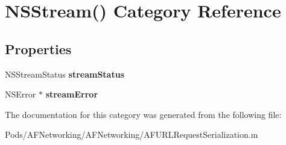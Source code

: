 \hypertarget{category_n_s_stream_07_08}{}\section{N\+S\+Stream() Category Reference}
\label{category_n_s_stream_07_08}
\subsection*{Properties}
\begin{DoxyCompactItemize}
\item 
\mbox{\label{category_n_s_stream_07_08_a380fb254540df401c389d64b0159d9da}} 
N\+S\+Stream\+Status {\bfseries stream\+Status}
\item 
\mbox{\label{category_n_s_stream_07_08_a44d8a05bedbaee9cef1399e6ecf7b67a}} 
N\+S\+Error $\ast$ {\bfseries stream\+Error}
\end{DoxyCompactItemize}


The documentation for this category was generated from the following file\+:\begin{DoxyCompactItemize}
\item 
Pods/\+A\+F\+Networking/\+A\+F\+Networking/A\+F\+U\+R\+L\+Request\+Serialization.\+m\end{DoxyCompactItemize}
